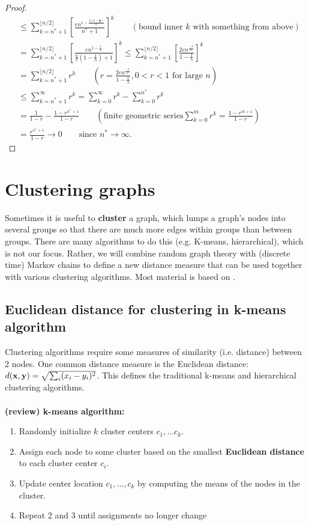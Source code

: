 \documentclass[./some_latex_template.tex]{subfiles}
\begin{document}
\begin{proof}
\begin{align*}
	&\le \sum_{k=n^* + 1}^{\lfloor n/2 \rfloor} \left[ \frac{en^{1-\frac{\lambda (n - \frac{n}{2})}{n}}}{n^* + 1}\right]^k \qquad (\text{bound inner } k \text{  with something from above})\\
	&= \sum_{k=n^* + 1}^{\lfloor n/2 \rfloor} \left[\frac{en^{1 - \frac{\lambda}{2}}}{\frac{n}{2}(1 - \frac{1}{\lambda}) + 1}\right]^k \le \sum_{k=n^* + 1}^{\lfloor n/2 \rfloor} \left[\frac{2en^{\frac{-\lambda}{2}}}{1 - \frac{1}{\lambda}}\right]^k\\
	&= \sum_{k=n^* + 1}^{\lfloor n/2 \rfloor}  r^k \qquad (r = \frac{2en^{\frac{-\lambda}{2}}}{1 - \frac{1}{\lambda}}, 0 < r < 1 \text{ for large }n)\\
	&\le \sum_{k=n^* + 1}^{\infty}r^k  = \sum_{k=0}^{\infty}r^k - \sum_{k=0}^{n^*}r^k\\
	&= \frac{1}{1-r} - \frac{1-r^{n^*+1}}{1-r} \qquad \left(\text{finite geometric series} \sum_{k=0}^{m}r^k = \frac{1-r^{m+1}}{1-r}\right)\\
	&= \frac{r^{n^* + 1}}{1-r} \longrightarrow 0 \qquad \text{since } n^* \rightarrow \infty.
\end{align*}
\end{proof}

\section{Clustering graphs}

Sometimes it is useful to \textbf{cluster} a graph, which lumps a graph's nodes into several groups so that there are much more edges within groups than between groups. There are many algorithms to do this (e.g. K-means, hierarchical), which is not our focus. Rather, we will combine random graph theory with (discrete time) Markov chains to define a new distance measure that can be used together with various clustering algorithms. Most material is based on \cite{yen2005clustering}. 

\subsection{Euclidean distance for clustering in k-means algorithm}

Clustering algorithms require some measures of similarity (i.e. distance) between 2 nodes. One common distance measure is the Euclidean distance: $d(\mathbf{x}, \mathbf{y}) = \sqrt{\sum_{i}(x_i - y_i)^2}$. This defines the traditional k-means and hierarchical clustering algorithms.\\
\\
\textbf{(review) k-means algorithm:}
\begin{enumerate}
	\item Randomly initialize $k$ cluster centers $c_1,...c_k$. 
	\item Assign each node to some cluster based on the smallest \textbf{Euclidean distance} to each cluster center $c_i$.
	\item Update center location $c_1, ..., c_k$ by computing the means of the nodes in the cluster. 
	\item Repeat 2 and 3 until assignments no longer change
\end{enumerate}
\end{document}
